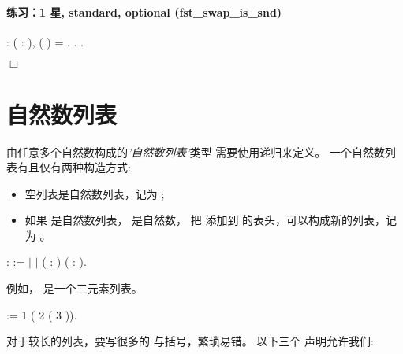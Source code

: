 \documentclass[12pt]{report}
\begin{document}
{{{\paragraph{练习：1 星, standard, optional (fst\_swap\_is\_snd)}

\begin{coqdoccode}
\coqdocnoindent
{}  : \coqdockw{\ensuremath{\forall}} ( : ),\coqdoceol
\coqdocindent{1.00em}
 ( ) =  .\coqdoceol
\coqdocnoindent
{}.\coqdoceol
\coqdocnoindent
{}.\coqdoceol
\end{coqdoccode}
\ensuremath{\Box} \begin{coqdoccode}
\end{coqdoccode}
\section{自然数列表}





  由任意多个自然数构成的\textit{'自然数列表'}类型
  需要使用递归来定义。
  一个自然数列表有且仅有两种构造方式:

\begin{itemize}
\item  空列表是自然数列表，记为 ;

\item  如果  是自然数列表， 是自然数，
    把  添加到  的表头，可以构成新的列表，记为   。

\end{itemize}
\begin{coqdoccode}
\coqdocemptyline
\coqdocnoindent
{}  :  :=\coqdoceol
\coqdocindent{1.00em}
\ensuremath{|} \coqdoceol
\coqdocindent{1.00em}
\ensuremath{|}  ( : ) ( : ).\coqdoceol
\coqdocemptyline
\end{coqdoccode}
例如， 是一个三元素列表。\begin{coqdoccode}
\coqdocemptyline
\coqdocnoindent
{}  :=  1 ( 2 ( 3 )).\coqdoceol
\coqdocemptyline
\end{coqdoccode}
  对于较长的列表，要写很多的  与括号，繁琐易错。
  以下三个  声明允许我们:

}}}
\end{document}
